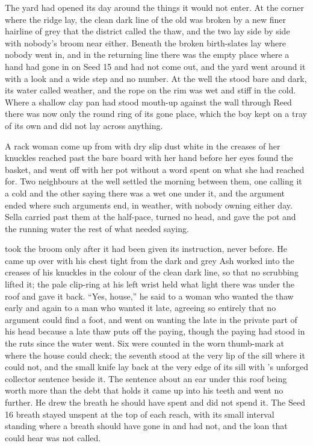 The yard had opened its day around the things it would not enter. At the corner where the ridge lay, the clean dark line of the old  was broken by a new finer hairline of grey that the district called the thaw, and the two lay side by side with nobody's broom near either. Beneath  the broken birth-slates lay where nobody went in, and in the returning line there was the empty place where a hand had gone in on Seed 15 and had not come out, and the yard went around it with a look and a wide step and no number. At the well the  stood bare and dark, its water called weather, and the rope on the rim was wet and stiff in the cold. Where a shallow clay pan had stood mouth-up against the wall through Reed there was now only the round ring of its gone place, which the boy kept on a tray of its own and did not lay across anything.

A rack woman come up from  with dry slip dust white in the creases of her knuckles reached past the bare board with her hand before her eyes found the basket, and went off with her pot without a word spent on what she had reached for. Two neighbours at the well settled the morning between them, one calling it a cold and the other saying there was a wet one under it, and the argument ended where such arguments end, in weather, with nobody owning either day. Sella carried past them at the half-pace, turned no head, and gave the pot and the running water the rest of what needed saying.

 took the broom only after it had been given its instruction, never before. He came up over  with his chest tight from the dark and grey Ash worked into the creases of his knuckles in the colour of the clean dark line, so that no scrubbing lifted it; the pale clip-ring at his left wrist held what light there was under the roof and gave it back. “Yes, house,” he said to a woman who wanted the thaw early and again to a man who wanted it late, agreeing so entirely that no argument could find a foot, and went on wanting the late in the private part of his head because a late thaw puts off the paying, though the paying had stood in the ruts since the water went. Six were counted in the worn thumb-mark at  where the house could check; the seventh stood at the very lip of the sill where it could not, and the small knife lay back at the very edge of its sill with 's unforged collector sentence beside it. The sentence about an ear under this roof being worth more than the debt that holds it came up into his teeth and went no further. He drew the breath he should have spent and did not spend it. The Seed 16 breath stayed unspent at the top of each reach, with its small interval standing where a breath should have gone in and had not, and the loan that could hear was not called.

